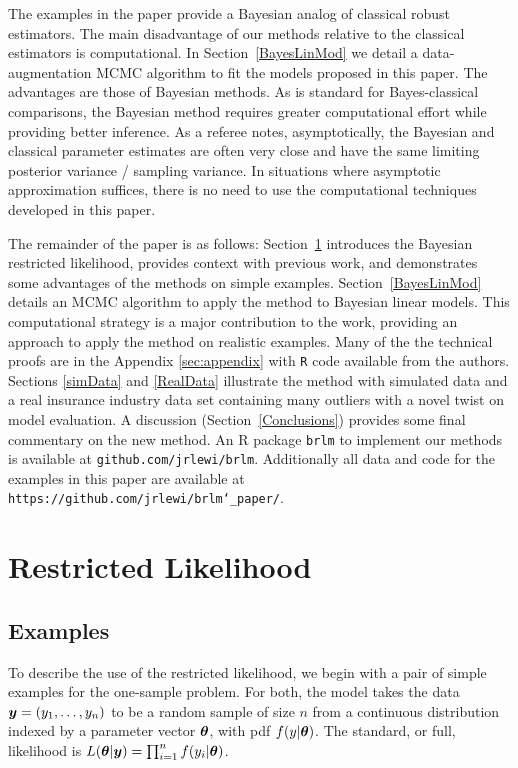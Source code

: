 \documentclass[ba]{imsart}
\def\bth{\mbox{\boldmath $\theta$}}
\newcommand{\by}{\mbox{\boldmath $y$}}
\newcommand{\response}[1]{{\color{blue}#1}}
\begin{document}
\response{The examples in the paper provide a Bayesian analog of classical robust estimators.  The main disadvantage of our methods relative to the classical estimators is computational.  In Section~\ref{BayesLinMod} we detail a data-augmentation MCMC algorithm to fit the models proposed in this paper.  The advantages are those of Bayesian methods.  As is standard for Bayes-classical comparisons, the Bayesian method requires greater computational effort while providing better inference.  As a referee notes, asymptotically, the Bayesian and classical parameter estimates are often very close and have the same limiting posterior variance / sampling variance.  In situations where asymptotic approximation suffices, there is no need to use the computational techniques developed in this paper.}

The remainder of the paper is as follows: Section~\ref{restrictedlikelihood} introduces the Bayesian restricted likelihood, provides context with previous work, and demonstrates some advantages of the methods on simple examples. Section~\ref{BayesLinMod} details an MCMC algorithm to apply the method to Bayesian linear models. This computational strategy is a major contribution to the work, providing an approach to apply the method on realistic examples. Many of the the technical proofs are in the Appendix \ref{sec:appendix} with \texttt{R} code available from the authors. Sections \ref{simData} and \ref{RealData} illustrate the method with simulated data and a real insurance industry data set containing many outliers with a novel twist on model evaluation. A discussion (Section~\ref{Conclusions}) provides some final commentary on the new method. \response{ An R package \texttt{brlm} to implement our methods is available at \texttt{github.com/jrlewi/brlm}. Additionally all data and code for the examples in this paper are available at \texttt{https://github.com/jrlewi/brlm\char`_paper/}.}

\section{Restricted Likelihood}
\label{restrictedlikelihood}

\subsection{Examples}
To describe the use of the restricted likelihood, 
we begin with a pair of simple examples for the one-sample problem.  For both, the model takes the data $\by=(y_1,\ldots,y_n)$ to be a random sample
of size $n$ from a continuous distribution indexed by a parameter
vector $\bth$, with pdf $f(y| \bth)$.  The standard, or full,
likelihood is $L(\bth | \by) = \prod_{i=1}^n f(y_i | \bth)$.  
\end{document}
